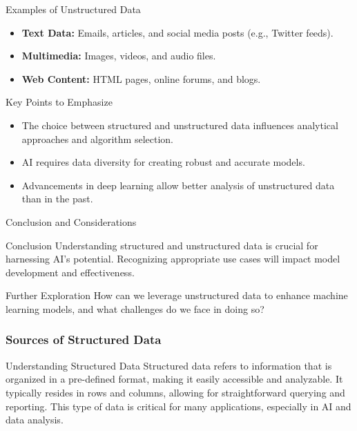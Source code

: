 \documentclass[aspectratio=169]{beamer}
\begin{document}
\begin{frame}[fragile]{Examples of Unstructured Data}
    \begin{itemize}
        \item \textbf{Text Data:} Emails, articles, and social media posts (e.g., Twitter feeds).
        \item \textbf{Multimedia:} Images, videos, and audio files.
        \item \textbf{Web Content:} HTML pages, online forums, and blogs.
    \end{itemize}
\end{frame}

\begin{frame}[fragile]{Key Points to Emphasize}
    \begin{itemize}
        \item The choice between structured and unstructured data influences analytical approaches and algorithm selection.
        \item AI requires data diversity for creating robust and accurate models.
        \item Advancements in deep learning allow better analysis of unstructured data than in the past.
    \end{itemize}
\end{frame}

\begin{frame}[fragile]{Conclusion and Considerations}
    \begin{block}{Conclusion}
        Understanding structured and unstructured data is crucial for harnessing AI's potential. Recognizing appropriate use cases will impact model development and effectiveness.
    \end{block}
    
    \begin{block}{Further Exploration}
        How can we leverage unstructured data to enhance machine learning models, and what challenges do we face in doing so?
    \end{block}
\end{frame}

\begin{frame}[fragile]
  \frametitle{Sources of Structured Data}
  \begin{block}{Understanding Structured Data}
    Structured data refers to information that is organized in a pre-defined format, making it easily accessible and analyzable. 
    It typically resides in rows and columns, allowing for straightforward querying and reporting. This type of data is critical for many applications, especially in AI and data analysis.
  \end{block}
\end{frame}
\end{document}

